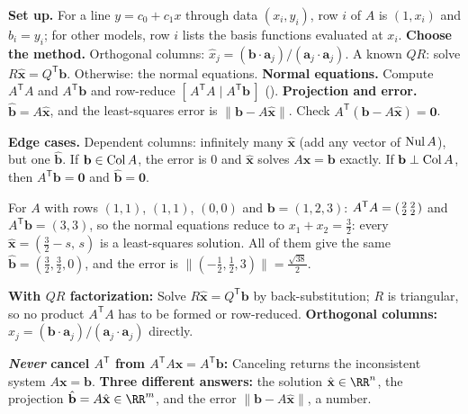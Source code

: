 \documentclass[10pt]{scrartcl}
\newcommand{\vv}[1]{\mathbf{#1}}
\newenvironment{howto}[1]{\begin{mdframed}[style=howtostyle,frametitle={#1}]}{\end{mdframed}}
\begin{document}
\begin{howto}{How to solve a least-squares problem}
  \begin{steps}
    \ii \textbf{Set up.} For a line $y=c_0+c_1x$ through data $(x_i,y_i)$, row $i$ of $A$ is $(1,x_i)$ and $b_i=y_i$; for other models, row $i$ lists the basis functions evaluated at $x_i$.
    \ii \textbf{Choose the method.} Orthogonal columns: $\hat x_j=(\vv b\cdot\vv a_j)/(\vv a_j\cdot\vv a_j)$. A known $QR$: solve $R\hat{\vv x}=Q^{\mathsf T}\vv b$. Otherwise: the normal equations.
    \ii \textbf{Normal equations.} Compute $A^{\mathsf T}A$ and $A^{\mathsf T}\vv b$ and row-reduce $[\,A^{\mathsf T}A\mid A^{\mathsf T}\vv b\,]$ ().
    \ii \textbf{Projection and error.} $\hat{\vv b}=A\hat{\vv x}$, and the least-squares error is $\|\vv b-A\hat{\vv x}\|$. Check $A^{\mathsf T}(\vv b-A\hat{\vv x})=\vv 0$.
  \end{steps}
  \textbf{Edge cases.} Dependent columns: infinitely many $\hat{\vv x}$ (add any vector of $\operatorname{Nul} A$), but one $\hat{\vv b}$. If $\vv b\in\Col A$, the error is $0$ and $\hat{\vv x}$ solves $A\vv x=\vv b$ exactly. If $\vv b\perp\Col A$, then $A^{\mathsf T}\vv b=\vv 0$ and $\hat{\vv b}=\vv 0$.
\end{howto}

\begin{example*}
  For $A$ with rows $(1,1)$, $(1,1)$, $(0,0)$ and $\vv b=(1,2,3)$: $A^{\mathsf T}A=\begin{psmallmatrix}2&2\\2&2\end{psmallmatrix}$ and $A^{\mathsf T}\vv b=(3,3)$, so the normal equations reduce to $x_1+x_2=\frac32$: every $\hat{\vv x}=(\frac32-s,\,s)$ is a least-squares solution. All of them give the same $\hat{\vv b}=(\frac32,\frac32,0)$, and the error is $\|(-\frac12,\frac12,3)\|=\frac{\sqrt{38}}{2}$.
\end{example*}

\begin{shortcuts}
  \ii \textbf{With $QR$ factorization:} Solve $R\hat{\vv x}=Q^{\mathsf T}\vv b$ by back-substitution; $R$ is triangular, so no product $A^{\mathsf T}A$ has to be formed or row-reduced.
  \ii \textbf{Orthogonal columns:} $\hat{x}_j = (\vv b\cdot\vv a_j)/(\vv a_j\cdot\vv a_j)$ directly.
\end{shortcuts}

\begin{trapbox}
  \ii \textbf{\emph{Never} cancel $A^{\mathsf T}$ from $A^{\mathsf T}A\vv x=A^{\mathsf T}\vv b$:} Canceling returns the inconsistent system $A\vv x=\vv b$.
  \ii \textbf{Three different answers:} the solution $\hat{\vv x}\in\RR^n$, the projection $\hat{\vv b}=A\hat{\vv x}\in\RR^m$, and the error $\|\vv b-A\hat{\vv x}\|$, a number.
\end{trapbox}
\end{document}
